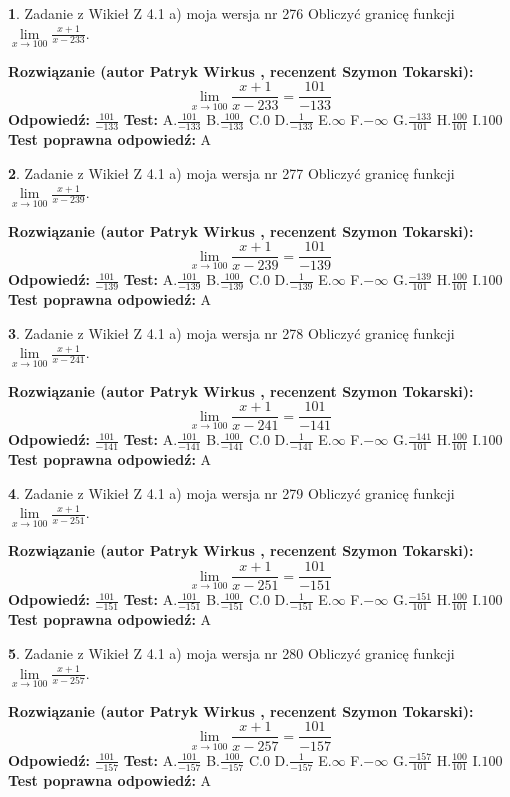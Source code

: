 \documentclass[12pt, a4paper]{article}
\theoremstyle{definition} %
\newtheorem{zad}{}
\newcommand{\zadStart}[1]{\begin{zad}#1\newline}
\newcommand{\zadStop}{\end{zad}}
\newcommand{\rozwStart}[2]{\noindent \textbf{Rozwiązanie (autor #1 , recenzent #2): }\newline}
\newcommand{\rozwStop}{\newline}
\newcommand{\odpStart}{\noindent \textbf{Odpowiedź:}\newline}
\newcommand{\odpStop}{\newline}
\newcommand{\testStart}{\noindent \textbf{Test:}\newline}
\newcommand{\testStop}{\newline}
\newcommand{\kluczStart}{\noindent \textbf{Test poprawna odpowiedź:}\newline}
\newcommand{\kluczStop}{\newline}
\begin{document}
\zadStart{Zadanie z Wikieł Z 4.1 a) moja wersja nr 276}
Obliczyć granicę funkcji $\lim\limits_{x\to100}\frac{x+1}{x-233}$.
\zadStop
\rozwStart{Patryk Wirkus}{Szymon Tokarski}
$$\lim\limits_{x\to100}\frac{x+1}{x-233} = \frac{101}{-133}$$
\rozwStop
\odpStart
$\frac{101}{-133}$
\odpStop
\testStart
A.$\frac{101}{-133}$
B.$\frac{100}{-133}$
C.$0$
D.$\frac{1}{-133}$
E.$\infty$
F.$-\infty$
G.$\frac{-133}{101}$
H.$\frac{100}{101}$
I.$100$
\testStop
\kluczStart
A
\kluczStop



\zadStart{Zadanie z Wikieł Z 4.1 a) moja wersja nr 277}
Obliczyć granicę funkcji $\lim\limits_{x\to100}\frac{x+1}{x-239}$.
\zadStop
\rozwStart{Patryk Wirkus}{Szymon Tokarski}
$$\lim\limits_{x\to100}\frac{x+1}{x-239} = \frac{101}{-139}$$
\rozwStop
\odpStart
$\frac{101}{-139}$
\odpStop
\testStart
A.$\frac{101}{-139}$
B.$\frac{100}{-139}$
C.$0$
D.$\frac{1}{-139}$
E.$\infty$
F.$-\infty$
G.$\frac{-139}{101}$
H.$\frac{100}{101}$
I.$100$
\testStop
\kluczStart
A
\kluczStop



\zadStart{Zadanie z Wikieł Z 4.1 a) moja wersja nr 278}
Obliczyć granicę funkcji $\lim\limits_{x\to100}\frac{x+1}{x-241}$.
\zadStop
\rozwStart{Patryk Wirkus}{Szymon Tokarski}
$$\lim\limits_{x\to100}\frac{x+1}{x-241} = \frac{101}{-141}$$
\rozwStop
\odpStart
$\frac{101}{-141}$
\odpStop
\testStart
A.$\frac{101}{-141}$
B.$\frac{100}{-141}$
C.$0$
D.$\frac{1}{-141}$
E.$\infty$
F.$-\infty$
G.$\frac{-141}{101}$
H.$\frac{100}{101}$
I.$100$
\testStop
\kluczStart
A
\kluczStop



\zadStart{Zadanie z Wikieł Z 4.1 a) moja wersja nr 279}
Obliczyć granicę funkcji $\lim\limits_{x\to100}\frac{x+1}{x-251}$.
\zadStop
\rozwStart{Patryk Wirkus}{Szymon Tokarski}
$$\lim\limits_{x\to100}\frac{x+1}{x-251} = \frac{101}{-151}$$
\rozwStop
\odpStart
$\frac{101}{-151}$
\odpStop
\testStart
A.$\frac{101}{-151}$
B.$\frac{100}{-151}$
C.$0$
D.$\frac{1}{-151}$
E.$\infty$
F.$-\infty$
G.$\frac{-151}{101}$
H.$\frac{100}{101}$
I.$100$
\testStop
\kluczStart
A
\kluczStop



\zadStart{Zadanie z Wikieł Z 4.1 a) moja wersja nr 280}
Obliczyć granicę funkcji $\lim\limits_{x\to100}\frac{x+1}{x-257}$.
\zadStop
\rozwStart{Patryk Wirkus}{Szymon Tokarski}
$$\lim\limits_{x\to100}\frac{x+1}{x-257} = \frac{101}{-157}$$
\rozwStop
\odpStart
$\frac{101}{-157}$
\odpStop
\testStart
A.$\frac{101}{-157}$
B.$\frac{100}{-157}$
C.$0$
D.$\frac{1}{-157}$
E.$\infty$
F.$-\infty$
G.$\frac{-157}{101}$
H.$\frac{100}{101}$
I.$100$
\testStop
\kluczStart
A
\kluczStop
\end{document}
